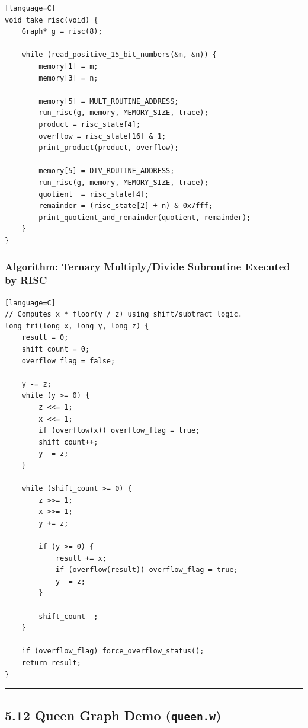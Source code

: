 \documentclass[11pt]{article}
\begin{document}
\begin{verbatim}[language=C]
void take_risc(void) {
    Graph* g = risc(8);

    while (read_positive_15_bit_numbers(&m, &n)) {
        memory[1] = m;
        memory[3] = n;

        memory[5] = MULT_ROUTINE_ADDRESS;
        run_risc(g, memory, MEMORY_SIZE, trace);
        product = risc_state[4];
        overflow = risc_state[16] & 1;
        print_product(product, overflow);

        memory[5] = DIV_ROUTINE_ADDRESS;
        run_risc(g, memory, MEMORY_SIZE, trace);
        quotient  = risc_state[4];
        remainder = (risc_state[2] + n) & 0x7fff;
        print_quotient_and_remainder(quotient, remainder);
    }
}
\end{verbatim}

\subsubsection{Algorithm: Ternary Multiply/Divide Subroutine Executed by RISC}\label{algorithm-ternary-multiplydivide-subroutine-executed-by-risc}

\begin{verbatim}[language=C]
// Computes x * floor(y / z) using shift/subtract logic.
long tri(long x, long y, long z) {
    result = 0;
    shift_count = 0;
    overflow_flag = false;

    y -= z;
    while (y >= 0) {
        z <<= 1;
        x <<= 1;
        if (overflow(x)) overflow_flag = true;
        shift_count++;
        y -= z;
    }

    while (shift_count >= 0) {
        z >>= 1;
        x >>= 1;
        y += z;

        if (y >= 0) {
            result += x;
            if (overflow(result)) overflow_flag = true;
            y -= z;
        }

        shift_count--;
    }

    if (overflow_flag) force_overflow_status();
    return result;
}
\end{verbatim}

\begin{center}\rule{0.5\linewidth}{0.5pt}\end{center}

\subsection{\texorpdfstring{5.12 Queen Graph Demo (\texttt{queen.w})}{5.12 Queen Graph Demo (queen.w)}}\label{queen-graph-demo-queen.w}
\end{document}
